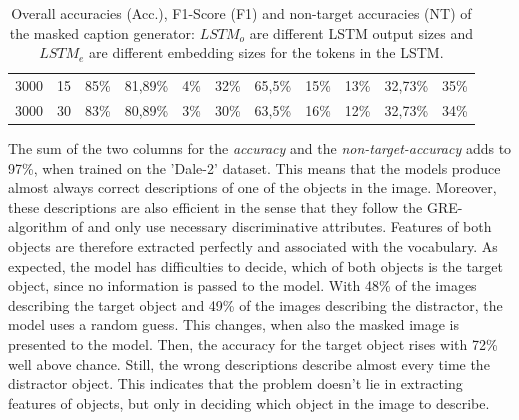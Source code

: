 \begin{table}[ht]
\begin{tabular}{cc|ccc|ccc|ccc}
        {3000}   & {15}     & {85\%}                              & {81,89\%}                           & {4\%}                                    & {32\%}        & {65,5\%}    & {15\%}      & {13\%}        & {32,73\%}   & {35\%}      \\
        {3000}   & {30}     & {83\%}                              & {80,89\%}                           & {3\%}                                    & {30\%}        & {63,5\%}    & {16\%}      & {12\%}        & {32,73\%}   & {34\%}      \\
        \bottomrule
    \end{tabular}
    \caption{Overall accuracies (Acc.), F1-Score (F1) and non-target accuracies (NT) of the masked caption generator: $LSTM_o$ are different LSTM output sizes and $LSTM_e$ are different embedding sizes for the tokens in the LSTM.}
    \label{tab:results:masked-re-generator}
\end{table}

The sum of the two columns for the \emph{accuracy} and the \emph{non-target-accuracy} adds to 97\%, when trained on the 'Dale-2' dataset.
This means that the models produce almost always correct descriptions of one of the objects in the image.
Moreover, these descriptions are also efficient in the sense that they follow the GRE-algorithm of \citet{Dale1995} and only use necessary discriminative attributes.
Features of both objects are therefore extracted perfectly and associated with the vocabulary.
As expected, the model has difficulties to decide, which of both objects is the target object, since no information is passed to the model.
With 48\% of the images describing the target object and 49\% of the images describing the distractor, the model uses a random guess.
This changes, when also the masked image is presented to the model.
Then, the accuracy for the target object rises with 72\% well above chance.
Still, the wrong descriptions describe almost every time the distractor object.
This indicates that the problem doesn't lie in extracting features of objects, but only in deciding which object in the image to describe.

